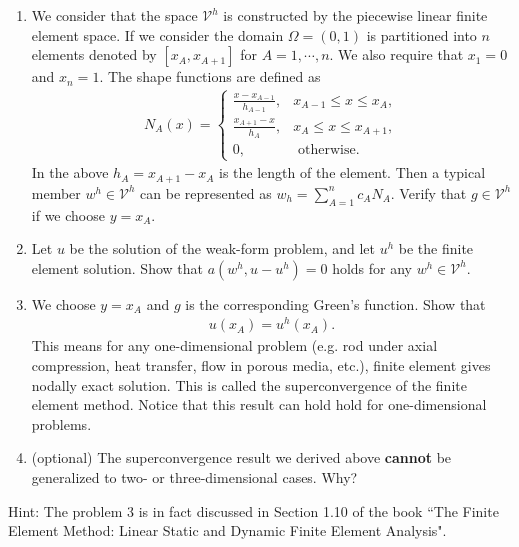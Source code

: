 \documentclass[12pt]{article}
\begin{document}
\begin{enumerate}
\begin{enumerate}
\item We consider that the space $\mathcal V^h$ is constructed by the piecewise linear finite element space. If we consider the domain $\Omega = (0,1)$ is partitioned into $n$ elements denoted by $[x_A, x_{A+1}]$ for $A=1, \cdots,  n$. We also require that $x_1 = 0$ and $x_n = 1$. The shape functions are defined as
\begin{align*}
N_A(x) = 
\begin{cases}
\frac{x-x_{A-1}}{h_{A-1}}, & x_{A-1} \leq x \leq x_A, \\
\frac{x_{A+1}-x}{h_A}, & x_A \leq x \leq x_{A+1}, \\
0, & \mbox{ otherwise. }
\end{cases}
\end{align*}
In the above $h_A =x_{A+1} -x_{A}$ is the length of the element. Then a typical member $w^h \in \mathcal V^h$ can be represented as $w_h = \sum_{A=1}^{n}c_A N_A$. Verify that $g \in \mathcal V^h$ if we choose $y = x_A$.
\item Let $u$ be the solution of the weak-form problem, and let $u^h$ be the finite element solution. Show that $a(w^h, u-u^h) = 0$ holds for any $w^h \in \mathcal V^h$.

\item We choose $y=x_A$ and $g$ is the corresponding Green's function. Show that
\begin{align*}
u(x_A) = u^h(x_A).
\end{align*}
This means for any one-dimensional problem (e.g. rod under axial compression, heat transfer, flow in porous media, etc.), finite element gives nodally exact solution. This is called the superconvergence of the finite element method. Notice that this result can hold hold for one-dimensional problems.

\item (optional) The superconvergence result we derived above \textbf{cannot} be generalized to two- or three-dimensional cases. Why?
\end{enumerate}

Hint: The problem 3 is in fact discussed in Section 1.10 of the book ``The Finite Element Method: Linear Static and Dynamic Finite Element Analysis".
\end{enumerate}
\end{document}
